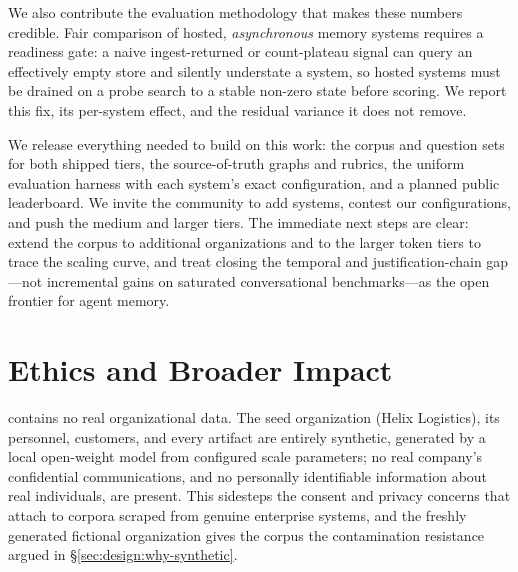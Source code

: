 We also contribute the evaluation methodology that makes these numbers credible.
Fair comparison of hosted, \emph{asynchronous} memory systems requires a
readiness gate: a naive ingest-returned or count-plateau signal can query an
effectively empty store and silently understate a system, so hosted systems must
be drained on a probe search to a stable non-zero state before scoring. We report
this fix, its per-system effect, and the residual variance it does not remove.

We release everything needed to build on this work: the \bench{} corpus and
question sets for both shipped tiers, the source-of-truth graphs and rubrics, the
uniform evaluation harness with each system's exact configuration, and a planned
public leaderboard. We invite the community to add systems, contest our
configurations, and push the medium and larger tiers. The immediate next steps
are clear: extend the corpus to additional organizations and to the larger token
tiers to trace the scaling curve, and treat closing the temporal and
justification-chain gap---not
incremental gains on saturated conversational benchmarks---as the open frontier
for agent memory.

\section*{Ethics and Broader Impact}
\label{sec:ethics}

\bench{} contains no real organizational data. The seed organization (Helix
Logistics), its personnel, customers, and every artifact are entirely synthetic,
generated by a local open-weight model from configured scale parameters; no
real company's confidential communications, and no personally identifiable
information about real individuals, are present. This sidesteps the consent and
privacy concerns that attach to corpora scraped from genuine enterprise systems,
and the freshly generated fictional organization gives the corpus the
contamination resistance argued in \S\ref{sec:design:why-synthetic}.

